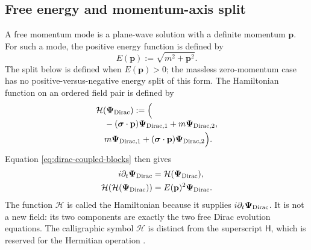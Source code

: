 \documentclass[10pt,letterpaper]{article}
\let\STAamsmathtext\text
\newcommand{\eqtext}[1]{\STAamsmathtext{\normalfont\rmfamily #1}}
\renewcommand{\text}[1]{\STAamsmathtext{\normalfont\rmfamily #1}}
\newcommand{\pv}[1]{#1}
\newcommand{\vct}[1]{\mathbf{#1}}
\newcommand{\sigv}{\vct{\pv{\bm{\sigma}}}}
\newcommand{\bPsi}{\pv{\bm{\Psi}}}
\newcommand{\Hop}{\mathsf H}
\begin{document}
\subsection{Free energy and momentum-axis split}
A free momentum mode is a plane-wave solution with a definite momentum
\(\vct{p}\). For such a mode, the positive energy function is defined by
\begin{equation}
E(\vct{p}):=\sqrt{m^2+\vct{p}^2}.
\label{eq:free-energy-function}
\end{equation}
The split below is defined when \(E(\vct{p})>0\); the massless
zero-momentum case has no positive-versus-negative energy split of this form.
The Hamiltonian function on an ordered field pair is defined by
\begin{equation}
\begin{aligned}
&\mathcal{H}(\bPsi_{\eqtext{Dirac}})
:=\Bigl(\\[-0.3em]
&\quad
-(\sigv\cdot\vct{p})\bPsi_{\eqtext{Dirac},1}
+m\bPsi_{\eqtext{Dirac},2},\\[-0.1em]
&\quad
m\bPsi_{\eqtext{Dirac},1}
+(\sigv\cdot\vct{p})\bPsi_{\eqtext{Dirac},2}
\Bigr).
\end{aligned}
\label{eq:dirac-hamiltonian}
\end{equation}
Equation \eqref{eq:dirac-coupled-blocks} then gives
\begin{equation}
\begin{aligned}
i\partial_t\bPsi_{\eqtext{Dirac}}
&=\mathcal{H}(\bPsi_{\eqtext{Dirac}}),\\
\mathcal{H}(\mathcal{H}(\bPsi_{\eqtext{Dirac}}))
&=E(\vct{p})^2\bPsi_{\eqtext{Dirac}}.
\end{aligned}
\label{eq:dirac-hamiltonian-action}
\end{equation}
The function \(\mathcal H\) is called the Hamiltonian because it supplies
\(i\partial_t\bPsi_{\eqtext{Dirac}}\). It is not a new field: its two
components are exactly the two free Dirac evolution equations. The
calligraphic symbol
\(\mathcal H\) is distinct from the superscript
\(\Hop\), which is reserved for the Hermitian operation
\cite{dirac1928,greiner2000}.
\end{document}

